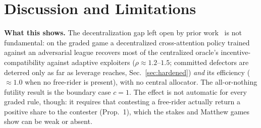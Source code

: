 \documentclass[conference, a4paper]{IEEEtran}
\begin{document}
\section{Discussion and Limitations}
\textbf{What this shows.} The decentralization gap left open by prior
work~\cite{savci2026exploit} is not fundamental: on the graded game a decentralized
cross-attention policy trained against an adversarial league recovers most of the
centralized oracle's incentive-compatibility against adaptive exploiters
($\rho{\approx}1.2$--$1.5$; committed defectors are deterred only as far as
leverage reaches, Sec.~\ref{sec:hardened}) \emph{and}
its efficiency (${\approx}1.0$ when no free-rider is present), with no central
allocator. The all-or-nothing futility result is the boundary case $c{=}1$. The
effect is not automatic for every graded rule, though: it requires that contesting a
free-rider actually return a positive share to the contester (Prop.~1), which the
stakes and Matthew games show can be weak or absent.
\end{document}
